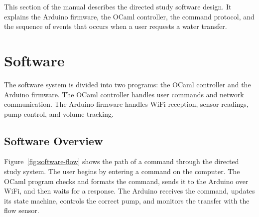 This section of the manual describes the directed study software design. It explains the Arduino firmware, the OCaml controller, the command protocol, and the sequence of events that occurs when a user requests a water transfer.

\chapter{Software}

The software system is divided into two programs: the OCaml controller and the Arduino firmware. The OCaml controller handles user commands and network communication. The Arduino firmware handles WiFi reception, sensor readings, pump control, and volume tracking.

\section{Software Overview}

Figure~\ref{fig:software-flow} shows the path of a command through the directed study system. The user begins by entering a command on the computer. The OCaml program checks and formats the command, sends it to the Arduino over WiFi, and then waits for a response. The Arduino receives the command, updates its state machine, controls the correct pump, and monitors the transfer with the flow sensor.

